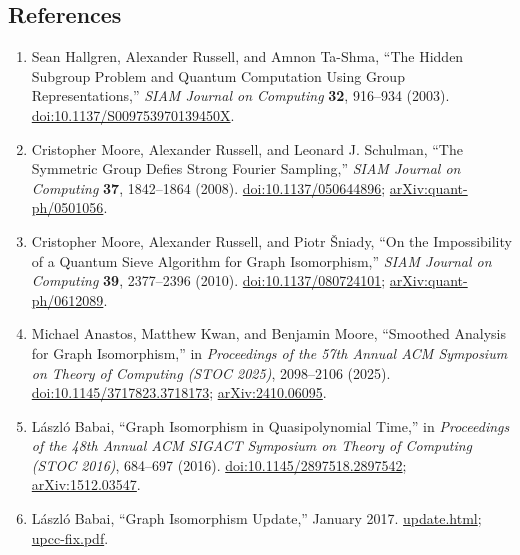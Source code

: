 \subsection*{References}

\begin{enumerate}[label={},leftmargin=4.8em,labelsep=0.5em]
  \footnotesize
  \item[\textup{[HRT03]}]\label{ref:7249-hrt}
  Sean Hallgren, Alexander Russell, and Amnon Ta-Shma, ``The Hidden Subgroup
Problem and Quantum Computation Using Group Representations,'' \emph{SIAM
Journal on Computing} \textbf{32}, 916--934 (2003).
\href{https://doi.org/10.1137/S009753970139450X}{doi:10.1137/S009753970139450X}.

  \item[\textup{[MRS08]}]\label{ref:7249-mrs-sampling}
  Cristopher Moore, Alexander Russell, and Leonard J. Schulman, ``The
Symmetric Group Defies Strong Fourier Sampling,'' \emph{SIAM Journal on
Computing} \textbf{37}, 1842--1864 (2008).
\href{https://doi.org/10.1137/050644896}{doi:10.1137/050644896};
\href{https://arxiv.org/abs/quant-ph/0501056}{arXiv:quant-ph/0501056}.

  \item[\textup{[MRS10]}]\label{ref:7249-mrs-sieve}
  Cristopher Moore, Alexander Russell, and Piotr \v{S}niady, ``On the
Impossibility of a Quantum Sieve Algorithm for Graph Isomorphism,'' \emph{SIAM
Journal on Computing} \textbf{39}, 2377--2396 (2010).
\href{https://doi.org/10.1137/080724101}{doi:10.1137/080724101};
\href{https://arxiv.org/abs/quant-ph/0612089}{arXiv:quant-ph/0612089}.

  \item[\textup{[AKM25]}]\label{ref:7249-akm-smoothed}
  Michael Anastos, Matthew Kwan, and Benjamin Moore, ``Smoothed
Analysis for Graph Isomorphism,'' in \emph{Proceedings of the 57th Annual ACM
Symposium on Theory of Computing (STOC 2025)}, 2098--2106 (2025).
\href{https://doi.org/10.1145/3717823.3718173}{doi:10.1145/3717823.3718173};
\href{https://arxiv.org/abs/2410.06095}{arXiv:2410.06095}.

  \item[\textup{[BAB16]}]\label{ref:7249-babai}
  L\'{a}szl\'{o} Babai, ``Graph Isomorphism in Quasipolynomial Time,'' in \emph{Proceedings of the 48th Annual ACM SIGACT Symposium on Theory of Computing (STOC 2016)}, 684--697 (2016).
\href{https://doi.org/10.1145/2897518.2897542}{doi:10.1145/2897518.2897542};
\href{https://arxiv.org/abs/1512.03547}{arXiv:1512.03547}.

  \item[\textup{[BABUP]}]\label{ref:7249-babai-update}
  L\'{a}szl\'{o} Babai, ``Graph Isomorphism Update,'' January 2017.
\href{https://people.cs.uchicago.edu/~laci/update.html}{update.html};
\href{https://people.cs.uchicago.edu/~laci/upcc-fix.pdf}{upcc-fix.pdf}.
\end{enumerate}

